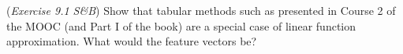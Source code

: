 (\textit{Exercise 9.1 S\&B})
Show that tabular methods such as presented in Course 2 of the MOOC (and Part I of the book) are a
special case of linear function approximation. What would the feature vectors be?